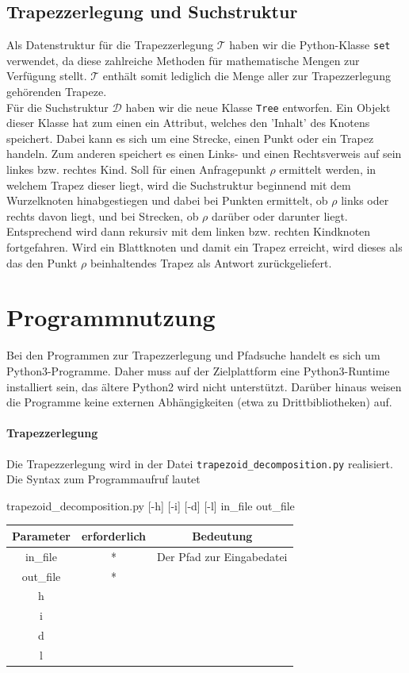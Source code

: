 \documentclass[11pt, a4paper]{article}
\newcommand{\T}{\ensuremath{\mathcal{T}} }
\newcommand{\D}{\ensuremath{\mathcal{D}} }
\begin{document}
\subsection{Trapezzerlegung und Suchstruktur}

Als Datenstruktur für die Trapezzerlegung \T haben wir die Python-Klasse \texttt{set} verwendet, da diese zahlreiche Methoden für mathematische Mengen zur Verfügung stellt. \T enthält somit lediglich die Menge aller zur Trapezzerlegung gehörenden Trapeze.\\
Für die Suchstruktur \D haben wir die neue Klasse \texttt{Tree} entworfen. Ein Objekt dieser Klasse hat zum einen ein Attribut, welches den 'Inhalt' des Knotens speichert. Dabei kann es sich um eine Strecke, einen Punkt oder ein Trapez handeln. Zum anderen speichert es einen Links- und einen Rechtsverweis auf sein linkes bzw. rechtes Kind. Soll für einen Anfragepunkt $\rho$ ermittelt werden, in welchem Trapez dieser liegt, wird die Suchstruktur beginnend mit dem Wurzelknoten hinabgestiegen und dabei bei Punkten ermittelt, ob $\rho$ links oder rechts davon liegt, und bei Strecken, ob $\rho$ darüber oder darunter liegt. Entsprechend wird dann rekursiv mit dem linken bzw. rechten Kindknoten fortgefahren. Wird ein Blattknoten und damit ein Trapez erreicht, wird dieses als das den Punkt $\rho$ beinhaltendes Trapez als Antwort zurückgeliefert.


\section{Programmnutzung}
Bei den Programmen zur Trapezzerlegung und Pfadsuche handelt es sich um Python3-Programme. Daher muss auf der Zielplattform eine Python3-Runtime installiert sein, das ältere Python2 wird nicht unterstützt. Darüber hinaus weisen die Programme keine externen Abhängigkeiten (etwa zu Drittbibliotheken) auf.

\paragraph{Trapezzerlegung} Die Trapezzerlegung wird in der Datei \texttt{trapezoid\_decomposition.py} realisiert. Die Syntax zum Programmaufruf lautet

trapezoid\_decomposition.py [-h] [-i] [-d] [-l] in\_file out\_file

\begin{tabular}{|c|c|c|}
	\hline
	Parameter & erforderlich & Bedeutung \\
	\hline
	in\_file & * & Der Pfad zur Eingabedatei \\
	out\_file & * & \\
	h & & \\
	i & & \\
	d & & \\
	l & & \\
	\hline
\end{tabular}
\end{document}
